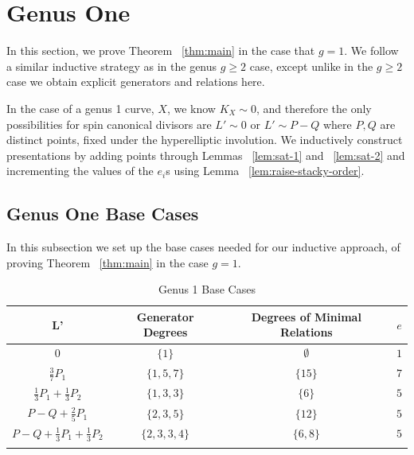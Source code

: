 \documentclass{amsart}
\theoremstyle{plain}
\theoremstyle{definition}
\theoremstyle{remark}
\numberwithin{equation}{section}
\newcommand\ssec{\subsection}
\newcommand{\halfcan}{L}
\begin{document}

\section{Genus One}
\label{sec:g_1}

In this section, we prove Theorem ~\ref{thm:main} in the case that $g = 1$.  We follow a similar inductive strategy as in the genus $g\geq 2$ case, except unlike in the $g \geq 2$ case we obtain explicit generators and relations here.

In the case of a genus 1 curve, $X$, we know $K_X \sim 0$, and therefore the only possibilities for spin canonical divisors are $\halfcan' \sim 0$ or $\halfcan' \sim P - Q$ where $P,Q$ are distinct points, fixed  under the hyperelliptic involution. We inductively construct presentations by adding points through Lemmas ~\ref{lem:sat-1} and ~\ref{lem:sat-2} and incrementing the values of the $e_i$s using Lemma ~\ref{lem:raise-stacky-order}.

\ssec{Genus One Base Cases}
\label{ssec:g_1_base}
In this subsection we set up the base cases needed for our inductive approach, of proving Theorem ~\ref{thm:main} in the case $g = 1$.

\begin{longtable}	{| c || c | c | c |}	
	\hline
	L' & Generator Degrees & Degrees of Minimal Relations & $e$ \\
	\hline
	\hline
	$0$ & $\{1\}$ & $\emptyset$ & $1$ \\	\hline

	$\frac{3}{7} P_1$ & $\{1,5,7\}$ & $\{15\}$ & $7$ \\	\hline
	
	$\frac{1}{3} P_1 + \frac{1}{3} P_2$ & $\{1, 3, 3\}$ & $\{6\}$ & $5$ \\	\hline
	
	$P - Q + \frac{2}{5} P_1$ & $\{2, 3, 5\}$ & $\{12\}$ & $5$ \\	\hline
	
	$P - Q + \frac{1}{3} P_1 + \frac{1}{3}P_2$ & $\{2, 3, 3, 4\}$ & $\{6,8\}$ & $5$ \\	\hline
	
	\caption{Genus 1 Base Cases}
	\label{table:g-1-base}
	
\end{longtable}
\end{document}
